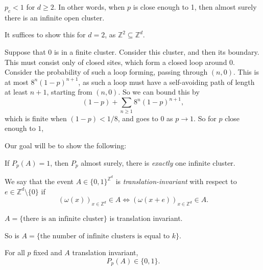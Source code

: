 \documentclass[12pt]{article}
\begin{document}
\begin{proposition}
	$p_c < 1$ for $d \geq 2$. In other words, when $p$ is close enough to 1, then almost surely there is an infinite open cluster.
\end{proposition}

\begin{proofbox}
	It suffices to show this for $d = 2$, as $\mathbb{Z}^2 \subseteq \mathbb{Z}^{d}$.

	Suppose that $0$ is in a finite cluster. Consider this cluster, and then its boundary. This must consist only of closed sites, which form a closed loop around 0. Consider the probability of such a loop forming, passing through $(n, 0)$. This is at most $8^{n} (1 - p)^{n+1}$, as such a loop must have a self-avoiding path of length at least $n+1$, starting from $(n, 0)$. So we can bound this by
	\[
		(1 - p) + \sum_{n \geq 1} 8^{n} (1 - p)^{n+1},
	\]
	which is finite when $(1 - p) < 1/8$, and goes to $0$ as $p \to 1$. So for $p$ close enough to $1$,
\end{proofbox}


Our goal will be to show the following:
\begin{proposition}
	If $P_p(A) = 1$, then $P_p$ almost surely, there is \emph{exactly} one infinite cluster.
\end{proposition}

\begin{definition}
	We say that the event $A \in \{0, 1\}^{\mathbb{Z}^{d}}$ is \emph{translation-invariant} with respect to $e \in \mathbb{Z}^{d} \setminus \{0\}$ if
	\[
		(\omega(x))_{x \in \mathbb{Z}^{d}} \in A \iff (\omega(x + e))_{x \in \mathbb{Z}^{d}} \in A.
	\]
\end{definition}

\begin{exbox}
	$A = \{\text{there is an infinite cluster}\}$ is translation invariant.

	So is $A = \{\text{the number of infinite clusters is equal to } k\}$.
\end{exbox}

\begin{lemma}
	For all $p$ fixed and $A$ translation invariant,
	\[
		P_p(A) \in \{0, 1\}.
	\]
\end{lemma}
\end{document}
